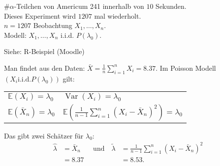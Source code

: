 \documentclass{tstextbook}
\DeclareMathOperator{\Var}{Var}
\newcommand{\E}{\mathbb E}
\begin{document}
\begin{example}
	$ \# \alpha $-Teilchen von Americum 241 innerhalb von $ 10 $ Sekunden. \\
	Dieses Experiment wird $ 1207 $ mal wiederholt.\\
	$ n=1207 $ Beobachtung $ X_1,\ldots,X_n. $\\
	Modell: $ X_1,\ldots,X_n $ i.i.d. $ P(\lambda_0). $
	
	Siehe: R-Beispiel (Moodle)
	
	Man findet aus den Daten: $ \bar{X} = \frac{1}{n} \sum_{i=1}^{n} X_i = 8.37 $.
	Im Poisson Modell $ (X_i \text{i.i.d.} P(\lambda_0)) $ gilt: 
	
	\begin{tabular}{ll}
		$ \E(X_i)=\lambda_0 $ 			& $ \Var(X_i) = \lambda_0 $ \\
		$ \E(\bar{X}_n) = \lambda_0 $ 	& $ \E\left(\frac{1}{n-1} \sum_{i=1}^{n}(X_i - \bar{X}_n)^2\right) = \lambda_0 $
	\end{tabular}
	
	Das gibt zwei Schätzer für $ \lambda_0 $:
	\[
	\begin{aligned}
		\hat{\lambda} & = \bar{X}_n \quad & \text{und} \quad \tilde{\lambda} & = \frac{1}{n-1} \sum_{i=1}^{n}(X_i - \bar{X}_n)^2 \\
		& = 8.37 & 						& = 8.53.
	\end{aligned}
	\]
	

\end{example}
\end{document}

